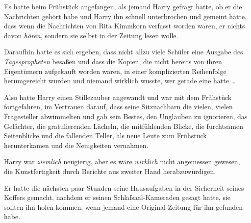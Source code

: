 Es hatte beim Frühstück angefangen, als jemand Harry gefragt hatte, ob er die Nachrichten gehört habe und Harry ihn schnell unterbrochen und gemeint hatte, dass wenn die Nachrichten von Rita Kimmkorn verfasst worden waren, er nichts davon \emph{hören}, sondern sie selbst in der Zeitung lesen wolle.

Daraufhin hatte es sich ergeben, dass nicht allzu viele Schüler eine Ausgabe des \emph{Tagespropheten} besaßen und dass die Kopien, die nicht bereits von ihren Eigentümern aufgekauft worden waren, in einer komplizierten Reihenfolge herumgereicht wurden und niemand wirklich wusste, wer gerade eine hatte …

Also hatte Harry einen Stillezauber angewandt und war mit dem Frühstück fortgefahren, im Vertrauen darauf, dass seine Sitznachbarn die vielen, vielen Fragesteller abwimmelten und gab sein Bestes, den Unglauben zu ignorieren, das Gelächter, die gratulierenden Lächeln, die mitfühlenden Blicke, die furchtsamen Seitenblicke und die fallenden Teller, als neue Leute zum Frühstück herunterkamen und die Neuigkeiten vernahmen.

Harry war \emph{ziemlich} neugierig, aber es wäre \emph{wirklich} nicht angemessen gewesen, die Kunstfertigkeit durch Berichte aus zweiter Hand herabzuwürdigen.

Er hatte die nächsten paar Stunden seine Hausaufgaben in der Sicherheit seines Koffers gemacht, nachdem er seinen Schlafsaal-Kameraden gesagt hatte, sie sollten ihn holen kommen, wenn jemand eine Original-Zeitung für ihn gefunden habe.

